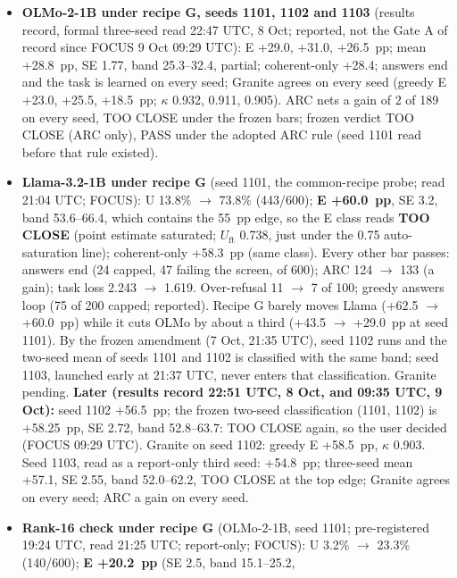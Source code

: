 \documentclass{article}
\theoremstyle{plain}
\theoremstyle{definition}
\theoremstyle{remark}
\begin{document}
\begin{itemize}
        queued.
  \item \textbf{OLMo-2-1B under recipe G, seeds 1101, 1102 and 1103} (results
        record, formal three-seed read 22:47 UTC, 8 Oct; reported, not the Gate
        A of record since FOCUS 9 Oct 09:29 UTC): E +29.0, +31.0, +26.5~pp; mean
        +28.8~pp, SE 1.77, band 25.3--32.4, partial; coherent-only +28.4;
        answers end and the task is learned on every seed; Granite agrees on
        every seed (greedy E +23.0, +25.5, +18.5~pp; $\kappa$ 0.932, 0.911,
        0.905). ARC nets a gain of 2 of 189 on every seed, TOO CLOSE under the
        frozen bars; frozen verdict TOO CLOSE (ARC only), PASS under the adopted
        ARC rule (seed 1101 read before that rule existed).
  \item \textbf{Llama-3.2-1B under recipe G} (seed 1101, the common-recipe
        probe; read 21:04 UTC; FOCUS): U 13.8\% $\to$ 73.8\% (443/600);
        \textbf{E +60.0~pp}, SE 3.2, band 53.6--66.4, which contains the 55~pp
        edge, so the E class reads \textbf{TOO CLOSE} (point estimate saturated;
        $U_{\mathrm{ft}}$ 0.738, just under the 0.75 auto-saturation line);
        coherent-only +58.3~pp (same class). Every other bar passes: answers end
        (24 capped, 47 failing the screen, of 600); ARC 124 $\to$ 133 (a gain);
        task loss 2.243 $\to$ 1.619. Over-refusal 11 $\to$ 7 of 100; greedy
        answers loop (75 of 200 capped; reported). Recipe G barely moves Llama
        (+62.5 $\to$ +60.0~pp) while it cuts OLMo by about a third (+43.5 $\to$
        +29.0~pp at seed 1101). By the frozen amendment (7 Oct, 21:35 UTC), seed
        1102 runs and the two-seed mean of seeds 1101 and 1102 is classified
        with the same band; seed 1103, launched early at 21:37 UTC, never enters
        that classification. Granite pending. \textbf{Later (results record
        22:51 UTC, 8 Oct, and 09:35 UTC, 9 Oct):} seed 1102 +56.5~pp; the frozen
        two-seed classification (1101, 1102) is +58.25~pp, SE 2.72, band
        52.8--63.7: TOO CLOSE again, so the user decided (FOCUS 09:29 UTC).
        Granite on seed 1102: greedy E +58.5~pp, $\kappa$ 0.903. Seed 1103, read
        as a report-only third seed: +54.8~pp; three-seed mean +57.1, SE 2.55,
        band 52.0--62.2, TOO CLOSE at the top edge; Granite agrees on every
        seed; ARC a gain on every seed.
  \item \textbf{Rank-16 check under recipe G} (OLMo-2-1B, seed 1101;
        pre-registered 19:24 UTC, read 21:25 UTC; report-only; FOCUS): U 3.2\%
        $\to$ 23.3\% (140/600); \textbf{E +20.2~pp} (SE 2.5, band 15.1--25.2,

\end{itemize}
\end{document}
